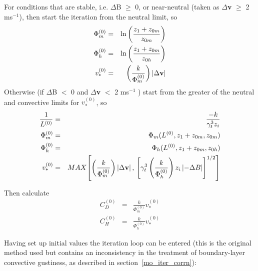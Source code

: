 \documentclass{UMDP_article}
\begin{document}
For conditions that are stable, i.e. $\Delta $B $\ge$ 0, or near-neutral (taken as 
$\Delta $\textbf{v} $\ge$ 2 ms$^{-1}$), then start the iteration from the neutral limit, so
\begin{eqnarray}
  \Phi _m^{(0)}&=&\ln  \left( {\frac{ z_1 +  z_{0m} }{ z_{0m} }} \right)
  \label{1.4.5} \\
  \Phi _h^{(0)}&=&\ln  \left( {\frac{ z_1 +  z_{0m} }{ z_{0h} }} \right)
  \label{1.4.6} \\
  v_\ast ^{(0)}&=&  {\left( {\frac{k}{ \Phi _m^{(0)} }} \right)} \left| {\Delta {{{\rm {\bf v}}}}} \right|
  \label{1.4.7}
\end{eqnarray}
Otherwise (if $\Delta $B $<$ 0 and $\Delta $\textbf{v} $<$ 2 ms$^{-1}$ ) start from the greater of the neutral and convective limits for $v_\ast^{(0)}$, so
\begin{eqnarray}
  \frac{1}{ L^{(0)} }&=&\frac{-k}{ \gamma _t^3  z_i }
  \label{1.4.1}\\
  \Phi _m^{(0)}&=& \Phi _m ( L^{(0)} ,  z_1 +  z_{0m} ,  z_{0m} )
  \label{1.4.2}\\
  \Phi _h^{(0)}&=& \Phi _h ( L^{(0)} ,  z_1 +  z_{0m} ,  z_{0h} )
  \label{1.4.3}\\
  v_\ast ^{(0)}&= & MAX{\left[ {\left( {\frac{k}{ \Phi _m^{(0)} }} \right)} \left| {\Delta {{{\rm {\bf v}}}}} \right|, \,
        {\left[ {  \gamma _t^3 \left( {\frac{k}{ \Phi _h^{(0)} }} \right)  z_i \left| {-\Delta B} \right| } \right]}^{ 1/2} \right]}
  \label{1.4.4}
\end{eqnarray}

Then calculate
\begin{eqnarray}
  C_D^{(0)}&=&\frac{k}{ \Phi _m^{(0)} }  v_\ast ^{(0)}
  \label{1.4.8} \\
  C_H^{(0)}&=&\frac{k}{ \Phi _h^{(0)} }  v_\ast ^{(0)}
  \label{1.4.9}
\end{eqnarray}

Having set up initial values the iteration loop can be entered (this
is the original method used but contains an inconsistency in the
treatment of boundary-layer convective gustiness, as described in
section~\ref{mo_iter_corrn}):
\end{document}
